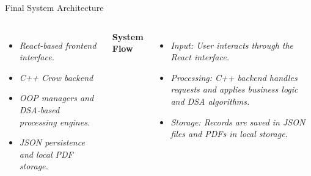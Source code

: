 \documentclass[aspectratio=169,11pt]{beamer}
\newcommand{\placeholder}[1]{%
\textit{\color{GEUGrey}#1}
}
\begin{document}
\begin{frame}{Final System Architecture}
\begin{columns}[T,totalwidth=\textwidth]
\begin{itemize}\itemsep2pt
    \item \placeholder{React-based frontend interface.}
    \item \placeholder{C++ Crow backend }
    \item \placeholder{OOP managers and DSA-based processing engines.}
    \item \placeholder{JSON persistence and local PDF storage.}
\end{itemize}

\vspace{-0.7cm}
\textbf{\color{GEUBlue}System Flow}

\begin{itemize}\itemsep2pt
    \item \placeholder{Input: User interacts through the React interface.}
    \item \placeholder{Processing: C++ backend handles requests and applies business logic and DSA algorithms.}
    \item \placeholder{Storage: Records are saved in JSON files and PDFs in local storage.}
\end{itemize}

\end{columns}

\vfill
\end{frame}
\end{document}
